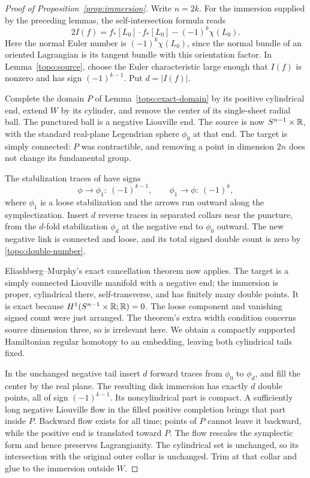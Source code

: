 \begin{proof}[Proof of Proposition~\ref{prop:immersion}]
Write $n=2k$.  For the immersion supplied by the preceding lemmas,
the self-intersection formula reads
\begin{equation}\label{topo:double-number}
 2I(f)=f_*[L_0]\cdot f_*[L_0]-(-1)^k\chi(L_0).
\end{equation}
Here the normal Euler number is $(-1)^k\chi(L_0)$, since the
normal bundle of an oriented Lagrangian is its tangent bundle
with this orientation factor.  In Lemma~\ref{topo:source}, choose
the Euler characteristic large enough that $I(f)$ is nonzero
and has sign $(-1)^{k-1}$.  Put $d=|I(f)|$.

Complete the domain $P$ of Lemma~\ref{topo:exact-domain} by its
positive cylindrical end, extend $W$ by its cylinder, and remove
the center of its single-sheet radial ball.  The punctured ball
is a negative Liouville end.  The source is now
$S^{n-1}\times\mathbb R$, with the standard real-plane Legendrian
sphere $\phi_0$ at that end.  The target is simply connected:
$P$ was contractible, and removing a point in dimension $2n$
does not change its fundamental group.

The stabilization traces of
\cite[Lemma~3.2 and proof of Lemma~3.4]{EEMS} have signs
\begin{equation}\label{topo:trace-signs}
 \phi\longrightarrow\phi_1:\ (-1)^{k-1},
 \qquad
 \phi_1\longrightarrow\phi:\ (-1)^k,
\end{equation}
where $\phi_1$ is a loose stabilization and the arrows run
outward along the symplectization.  Insert $d$ reverse traces
in separated collars near the puncture, from the $d$-fold
stabilization $\phi_d$ at the negative end to $\phi_0$ outward.
The new negative link is connected and loose, and its total
signed double count is zero by \eqref{topo:double-number}.

Eliashberg--Murphy's exact cancellation theorem
\cite[Theorem~2.3]{EliashbergMurphyCaps} now applies.  The target
is a simply connected Liouville manifold with a negative end;
the immersion is proper, cylindrical there, self-transverse,
and has finitely many double points.  It is exact because
$H^1(S^{n-1}\times\mathbb R;\mathbb R)=0$.  The loose component and vanishing
signed count were just arranged.  The theorem's extra width
condition concerns source dimension three, so is irrelevant
here.  We obtain a compactly supported Hamiltonian regular
homotopy to an embedding, leaving both cylindrical tails fixed.

In the unchanged negative tail insert $d$ forward traces from
$\phi_0$ to $\phi_d$, and fill the center by the real plane.
The resulting disk immersion has exactly $d$ double points,
all of sign $(-1)^{k-1}$.  Its noncylindrical part is compact.
A sufficiently long negative Liouville flow in the filled
positive completion brings that part inside $P$.  Backward
flow exists for all time; points of $P$ cannot leave it
backward, while the positive end is translated toward $P$.
The flow rescales the symplectic form and hence preserves
Lagrangianity.  The cylindrical set is unchanged, so its
intersection with the original outer collar is unchanged.
Trim at that collar and glue to the immersion outside $W$.


\end{proof}
